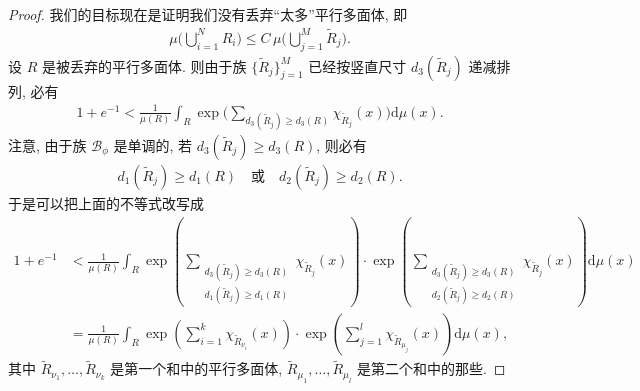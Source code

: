 \begin{proof}
我们的目标现在是证明我们没有丢弃``太多''平行多面体, 即
\begin{align*}
  \mu\Big(\bigcup_{i=1}^{N} R_{i}\Big)\leq C\,\mu\Big(\bigcup_{j=1}^{M}\tilde{R}_{j}\Big).
\end{align*}
设 $R$ 是被丢弃的平行多面体. 则由于族 $\{\tilde{R}_j\}_{j=1}^M$ 已经按竖直尺寸 $d_3(\tilde{R}_j)$ 递减排列, 必有
\begin{align*}
  1+e^{-1}<\frac{1}{\mu(R)}\int_{R}\exp\Big(\sum_{d_{3}(\tilde{R}_{j})\geq d_{3}(R)}\chi_{\tilde{R}_{j}}(x)\Big)\mathrm{d}\mu(x).
\end{align*}
注意, 由于族 $\mathcal{B}_\phi$ 是单调的, 若 $d_3(\tilde{R}_j) \geq d_3(R)$, 则必有
\begin{align*}
  d_{1}(\tilde{R}_{j})\geq d_{1}(R)\quad\text{或}\quad d_{2}(\tilde{R}_{j})\geq d_{2}(R).
\end{align*}
于是可以把上面的不等式改写成
\begin{equation}\label{eq:2.7}
  \begin{aligned}
  1+e^{-1}&<\frac{1}{\mu(R)}\int_{R}\exp\left(\sum_{\substack{d_{3}(\tilde{R}_{j})\geq d_{3}(R)\\ d_{1}(\tilde{R}_{j})\geq d_{1}(R)}}\chi_{\tilde{R}_{j}}(x)\right)
   \cdot\exp\left(\sum_{\substack{d_{3}(\tilde{R}_{j})\geq d_{3}(R)\\ d_{2}(\tilde{R}_{j})\geq d_{2}(R)}}\chi_{\tilde{R}_{j}}(x)\right)\mathrm{d}\mu(x)\\
  &=\frac{1}{\mu(R)}\int_{R}\exp\left(\sum_{i=1}^{k}\chi_{\tilde{R}_{\nu_{i}}}(x)\right)
   \cdot\exp\left(\sum_{j=1}^{l}\chi_{\tilde{R}_{\mu_{j}}}(x)\right)\mathrm{d}\mu(x),
  \end{aligned}
\end{equation}
其中 $\tilde{R}_{\nu_1}, \ldots, \tilde{R}_{\nu_k}$ 是第一个和中的平行多面体, $\tilde{R}_{\mu_1}, \ldots, \tilde{R}_{\mu_l}$ 是第二个和中的那些.


\end{proof}
